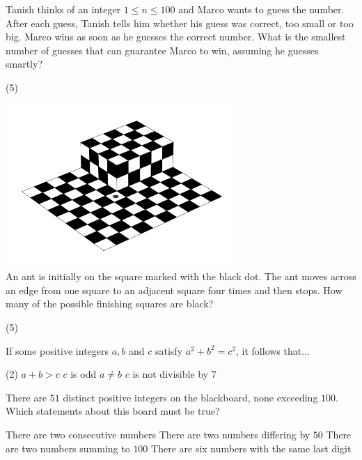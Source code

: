 \documentclass{article}
\begin{document}
\begin{problem}
Tanish thinks of an integer $1\leq n \leq 100$ and Marco wants to guess the number. After each guess, Tanish tells him whether his guess was correct, too small or too big. Marco wins as soon as he guesses the correct number. What is the smallest number of guesses that can guarantee Marco to win, assuming he guesses smartly?
\begin{tasks}(5)
\end{tasks}
\end{problem}

\newpage

\begin{problem}
\includegraphics[width=250pt]{Images/img7.png} \\
An ant is initially on the square marked with the black dot. The ant moves across an edge from one square to an adjacent square four times and then stops. How many of the possible finishing squares are black?
\begin{tasks}(5)
\end{tasks}
\end{problem}

\begin{problem}
If some positive integers $a,b$ and $c$ satisfy $a^2+b^2 = c^2$, it follows that...
\begin{tasks2}(2)
\task $a+b > c$
\task $c$ is odd
\task $a \neq b$
\task $c$ is not divisible by $7$
\end{tasks2}
\end{problem}

\begin{problem}
There are $51$ distinct positive integers on the blackboard, none exceeding $100$. Which statements about this board must be true?
\begin{tasks2}
\task There are two consecutive numbers
\task There are two numbers differing by $50$
\task There are two numbers summing to $100$
\task There are six numbers with the same last digit
\end{tasks2}
\end{problem}
\end{document}
